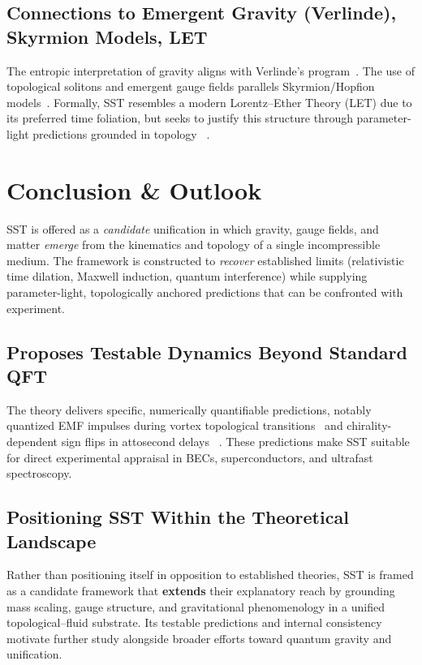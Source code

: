 \documentclass[10pt,reprint,aps,onecolumn,nofootinbib]{revtex4-2}
\begin{document}
        \subsection*{Connections to Emergent Gravity (Verlinde), Skyrmion Models, LET}
            The entropic interpretation of gravity aligns with Verlinde’s program~\cite{chiralSwirl, Verlinde2011,Verlinde2017,Jacobson1995}. The use of topological solitons and emergent gauge fields parallels Skyrmion/Hopfion models~\cite{sstLagrangian,Skyrme1962,MantonSutcliffe2004}. Formally, SST resembles a modern Lorentz–Ether Theory (LET) due to its preferred time foliation, but seeks to justify this structure through parameter-light predictions grounded in topology~ \cite{sstLagrangian}.

    \section{Conclusion \& Outlook}\label{sec:conclusion}
    SST is offered as a \emph{candidate} unification in which gravity, gauge fields, and matter \emph{emerge} from the kinematics and topology of a single incompressible medium. The framework is constructed to \emph{recover} established limits (relativistic time dilation, Maxwell induction, quantum interference) while supplying parameter-light, topologically anchored predictions that can be confronted with experiment.

        \subsection*{Proposes Testable Dynamics Beyond Standard QFT}
            The theory delivers specific, numerically quantifiable predictions, notably quantized EMF impulses during vortex topological transitions~ \cite{EM_G} and chirality-dependent sign flips in attosecond delays~ \cite{sstAttosecondPhotoionization}. These predictions make SST suitable for direct experimental appraisal in BECs, superconductors, and ultrafast spectroscopy.

        \subsection*{Positioning SST Within the Theoretical Landscape}
            Rather than positioning itself in opposition to established theories, SST is framed as a candidate framework that \textbf{extends} their explanatory reach by grounding mass scaling, gauge structure, and gravitational phenomenology in a unified topological–fluid substrate. Its testable predictions and internal consistency motivate further study alongside broader efforts toward quantum gravity and unification.
\end{document}
